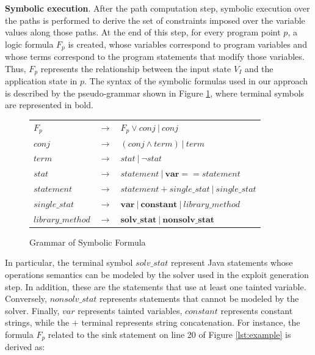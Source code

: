 \textbf{Symbolic execution}. After the path computation step, symbolic execution over the paths is performed to derive the set of constraints imposed over the variable values along those paths. At the end of this step, for every program point $p$, a logic formula $F_p$ is created, whose variables correspond to program variables and whose terms correspond to the program statements that modify those variables. Thus, $F_p$ represents the relationship between the input state $V_I$ and the application state in $p$.
The syntax of the symbolic formulas used in our approach is described by the pseudo-grammar shown in Figure \ref{fig:grammar}, where terminal symbols are represented in bold. \\
\vspace{-8pt}
\setlength{\belowcaptionskip}{-5pt}
\begin{figure}[h]
  \centering
		\begin{tabular}{lll}
			$F_p$  & $\rightarrow$ & $F_{p} \vee conj \ \vert \ conj$ \\
			$conj$ & $\rightarrow$ & $(conj \wedge term)\ \vert\ term$ \\
			$term$ & $\rightarrow$ & $stat\ \vert\ \neg stat$ \\
			$stat$ & $\rightarrow$ & $statement\ \vert\ \boldsymbol{var} == statement$ \\
			$statement$ & $\rightarrow$ & $statement\ \boldsymbol{+}\ single\_stat\ \vert\ single\_stat$ \\
			$single\_stat$ & $\rightarrow$ & $\boldsymbol{var}\ \vert\ \boldsymbol{constant}\ \vert\ library\_method$ \\
			$library\_method$ & $\rightarrow$ & $\boldsymbol{solv\_stat}\ \vert\ \boldsymbol{nonsolv\_stat}$ \\
		\end{tabular}
  	\caption{Grammar of Symbolic Formula}
	\label{fig:grammar}
 \end{figure}


In particular, the terminal symbol $solv\_stat$ represent Java statements whose operations semantics can be modeled by the solver used in the exploit generation step. In addition, these are the statements that use at least one tainted variable. Conversely, $nonsolv\_stat$ represents statements that cannot be modeled by the solver. Finally, $var$ represents tainted variables, $constant$ represents constant strings, while the $+$ terminal represents string concatenation. For instance, the formula $F_p$ related to the sink statement on line 20 of Figure \ref{lst:example} is derived as:

